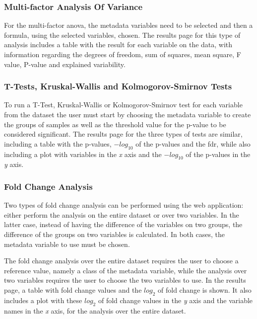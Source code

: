 \subsubsection{Multi-factor Analysis Of Variance}

For the multi-factor \gls{anova}, the metadata variables need to be selected and then a formula, using the selected variables, chosen. The results page for this type of analysis includes a table with the result for each variable on the data, with information regarding the degrees of freedom, sum of squares, mean square, F value, P-value and explained variability.

\subsubsection{T-Tests, Kruskal-Wallis and Kolmogorov-Smirnov Tests}

To run a T-Test, Kruskal-Wallis or Kolmogorov-Smirnov test for each variable from the dataset the user must start by choosing the metadata variable to create the groups of samples as well as the threshold value for the p-value to be considered significant. The results page for the three types of tests are similar, including a table with the p-values, $-log_{\text{10}}$ of the p-values and the \acrlong{fdr}, while also including a plot with variables in the \textit{x} axis and the $-log_{\text{10}}$ of the p-values in the \textit{y} axis.

\subsubsection{Fold Change Analysis}

Two types of fold change analysis can be performed using the web application: either perform the analysis on the entire dataset or over two variables. In the latter case, instead of having the difference of the variables on two groups, the difference of the groups on two variables is calculated. In both cases, the metadata variable to use must be chosen. 

The fold change analysis over the entire dataset requires the user to choose a reference value, namely a class of the metadata variable, while the analysis over two variables requires the user to choose the two variables to use. In the results page, a table with fold change values and the $log_{\text{2}}$ of fold change is shown. It also includes a plot with these $log_{\text{2}}$ of fold change values in the \textit{y} axis and the variable names in the \textit{x} axis, for the analysis over the entire dataset.


